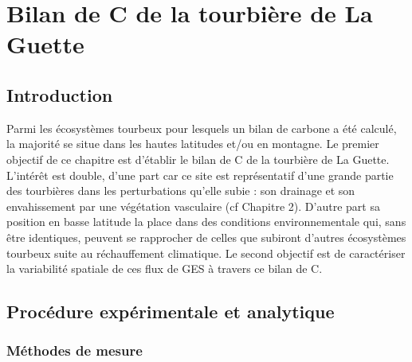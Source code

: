 \chapter{Bilan de C de la tourbière de La Guette}

\minitoc

\newpage

\section{Introduction}

Parmi les écosystèmes tourbeux pour lesquels un bilan de carbone a été calculé, la majorité se situe dans les hautes latitudes \plop et/ou en montagne.
Le premier objectif de ce chapitre est d'établir le bilan de C de la tourbière de La Guette.
L'intérêt est double, d'une part car ce site est représentatif d'une grande partie des tourbières dans les perturbations qu'elle subie : son drainage et son envahissement par une végétation vasculaire (cf Chapitre 2).
D'autre part sa position en basse latitude la place dans des conditions environnementale qui, sans être identiques, peuvent se rapprocher de celles que subiront d'autres écosystèmes tourbeux suite au réchauffement climatique.
Le second objectif est de caractériser la variabilité spatiale de ces flux de GES à travers ce bilan de C.

\section{Procédure expérimentale et analytique}

\subsection{Méthodes de mesure}

